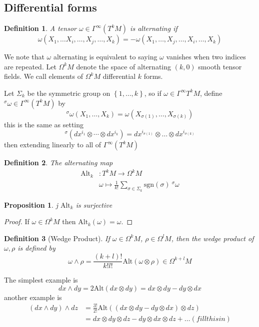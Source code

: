 \documentclass[a4paper]{article}
\newtheorem*{prop}{Proposition}
\newtheorem*{defn}{Definition}
\begin{document}
\subsection*{Differential forms}%
\begin{defn}
  A tensor $\omega \in \Gamma^\infty(T^kM)$ is alternating if 
\[
  \omega(X_1, \dots X_i, \dots, X_j, \dots, X_k) = -\omega(X_1, \dots, X_j, \dots, X_i, \dots, X_k) 
\]
\end{defn}
We note that $\omega$ alternating is equivalent to saying $\omega$ vanishes when two indices are repeated. Let $\Omega^kM$ denote the space of alternating $(k,0)$ smooth tensor fields. We call elements of $\Omega^kM$ differential $k$ forms.

Let $\Sigma_k$ be the symmetric group on $\left\{ 1, \dots, k \right\}$, so if $ \omega \in \Gamma^\infty T^kM$, define $^\sigma \omega \in \Gamma^{\infty} (T^kM)$ by
\[
  ^\sigma \omega(X_1, \dots, X_k) = \omega (X_{\sigma(1)}, \dots, X_{\sigma(k)})
\]
this is the same as setting
\[
  ^\sigma \left( dx^{i_1} \otimes \cdots \otimes dx^{i_k} \right) = dx^{i_{\sigma(1)}} \otimes \dots \otimes dx^{i_{\sigma(k)}}
\]
then extending linearly to all of $\Gamma^\infty (T^kM)$

\begin{defn}
  The alternating map 
  \[
    \begin{aligned}
      \text{Alt}_k&: T^k M \rightarrow \Omega^k M \\
                  &\omega \mapsto \frac{1}{k!} \sum_{\sigma \in \Sigma_k} \text{sgn}(\sigma)\ ^\sigma\omega
    \end{aligned}
  \]
\end{defn}

\begin{prop}j
  $\text{Alt}_k$ is surjective
\end{prop}
\begin{proof}
  If $\omega \in \Omega^k M$ then $\text{Alt}_k (\omega) = \omega$.
\end{proof}

\begin{defn}[Wedge Product]
  If $\omega \in \Omega^kM$, $\rho \in \Omega^lM$, then the wedge product of $\omega, \rho$ is defined by
  \[
    \omega \wedge \rho = \frac{(k+l)!}{k!l!} \text{Alt}(\omega \otimes \rho) \in \Omega^{k+l}M
  \]
\end{defn}
The simplest example is 
\[
  dx \wedge dy = 2 \text{Alt}(dx \otimes dy) = dx \otimes dy - dy \otimes dx
\]
another example is
\[
  \begin{aligned}
    (dx \wedge dy) \wedge dz &= \frac{3!}{2!} \text{Alt}((dx \otimes dy - dy \otimes dx) \otimes dz) \\
                             &= dx \otimes dy \otimes dz - dy \otimes dx \otimes dz + \dots (fill this in)
  \end{aligned}
\]
\end{document}
